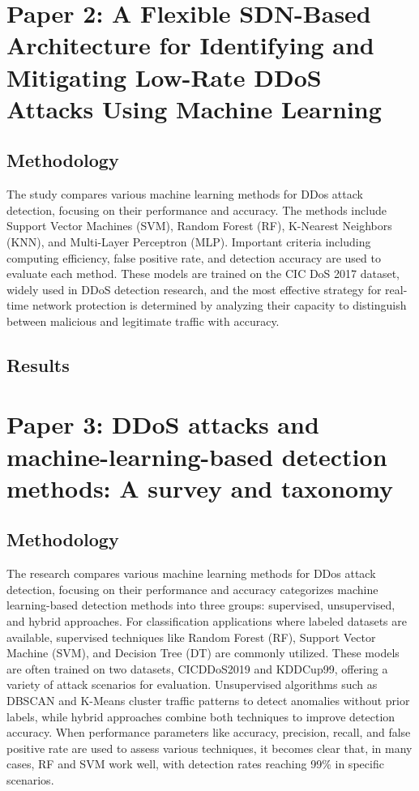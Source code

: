 \documentclass[a4paper, 12pt]{article}
\begin{document}
\section{Paper 2: A Flexible SDN-Based Architecture for Identifying and Mitigating Low-Rate DDoS Attacks Using Machine Learning}

\subsection{Methodology}
The study compares various machine learning methods for DDos attack detection, focusing on their performance and accuracy. The methods include Support Vector Machines (SVM), Random Forest (RF), K-Nearest Neighbors (KNN), and Multi-Layer Perceptron (MLP).  Important criteria including computing efficiency, false positive rate, and detection accuracy are used to evaluate each method. These models are trained on the CIC DoS 2017 dataset, widely used in DDoS detection research, and the most effective strategy for real-time network protection is determined by analyzing their capacity to distinguish between malicious and legitimate traffic with accuracy. 

\subsection{Results}

\section{Paper 3: DDoS attacks and machine-learning-based detection methods: A survey and taxonomy}

\subsection{Methodology}
The research compares various machine learning methods for DDos attack detection, focusing on their performance and accuracy categorizes machine learning-based detection methods into three groups: supervised, unsupervised, and hybrid approaches. For classification applications where labeled datasets are available, supervised techniques like Random Forest (RF), Support Vector Machine (SVM), and Decision Tree (DT) are commonly utilized. These models are often trained on two datasets, CICDDoS2019 and KDDCup99, offering a variety of attack scenarios for evaluation. Unsupervised algorithms such as DBSCAN and K-Means cluster traffic patterns to detect anomalies without prior labels, while hybrid approaches combine both techniques to improve detection accuracy. When performance parameters like accuracy, precision, recall, and false positive rate are used to assess various techniques, it becomes clear that, in many cases, RF and SVM work well, with detection rates reaching 99\% in specific scenarios. 
\end{document}
